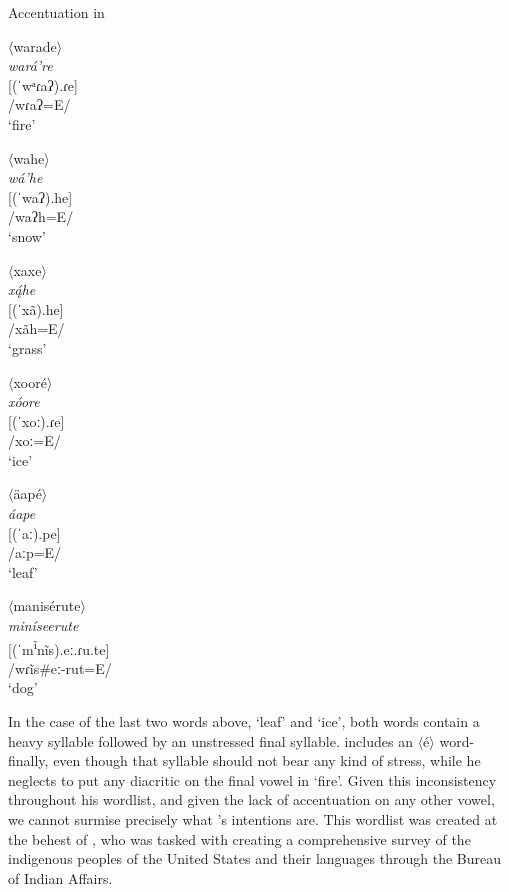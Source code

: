 \begin{exe}
\item\label{kipptrans} Accentuation in \citet{kipp1852}

\begin{xlist}
\item $\langle$warade$\rangle$\\
    \textit{wará're}\\
    {[}(ˈwᵃɾaʔ).ɾe]\\
    /wɾaʔ=E/\\
    `fire'

\item $\langle$wahe$\rangle$\\
	\textit{wá'he}\\
 	{[}(ˈwaʔ).he]\\
	/waʔh=E/\\
	`snow'




\item $\langle$xaxe$\rangle$\\
	\textit{xą́he}\\
	{[}(ˈxã).he]\\
	/xãh=E/\\
	`grass'

\item $\langle$xooré$\rangle$\\
	\textit{xóore}\\
	{[}(ˈxoː).ɾe]\\
	/xoː=E/\\
	`ice'

\item $\langle$äapé$\rangle$\\
	\textit{áape}\\
	{[}(ˈaː).pe]\\
        /aːp=E/\\
	`leaf'

\item $\langle$manisérute$\rangle$\\
	\textit{miníseerute}\\
	{[}(ˈm\textsuperscript{ĩ}nĩs).eː.ɾu.te]\\
	/wɾĩs\#eː-rut=E/\\
	`dog'
\end{xlist}

\end{exe}

In the case of the last two words above, `leaf' and `ice', both words contain a heavy syllable followed by an unstressed final syllable. \citet{kipp1852} includes an $\langle$é$\rangle$ word-finally, even though that syllable should not bear any kind of stress, while he neglects to put any diacritic on the final vowel in `fire'. Given this inconsistency throughout his wordlist, and given the lack of accentuation on any other vowel, we cannot surmise precisely what \citeauthor{kipp1852}'s intentions are. This wordlist was created at the behest of \citet{schoolcraft1853}, who was tasked with creating a comprehensive survey of the indigenous peoples of the United States and their languages through the Bureau of Indian Affairs.

